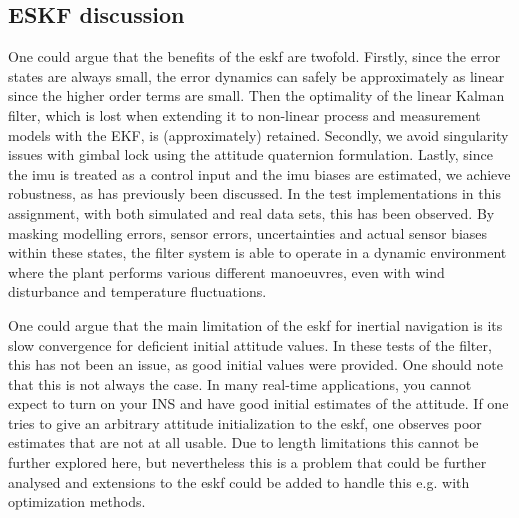 
\subsection{ESKF discussion}

One could argue that the benefits of the \acrshort{eskf} are twofold. Firstly, since the error states are always small, the error dynamics can safely be approximately as linear since the higher order terms are small. Then the optimality of the linear Kalman filter, which is lost when extending it to non-linear process and measurement models with the EKF, is (approximately) retained. Secondly, we avoid singularity issues with gimbal lock using the attitude quaternion formulation. Lastly, since the \acrshort{imu} is treated as a control input and the \acrshort{imu} biases are estimated, we achieve robustness, as has previously been discussed. In the test implementations in this assignment, with both simulated and real data sets, this has been observed. By masking modelling errors, sensor errors, uncertainties and actual sensor biases within these states, the filter system is able to operate in a dynamic environment where the plant performs various different manoeuvres, even with wind disturbance and temperature fluctuations.

One could argue that the main limitation of the \acrshort{eskf} for inertial navigation is its slow convergence for deficient initial attitude values. In these tests of the filter, this has not been an issue, as good initial values were provided. One should note that this is not always the case. In many real-time applications, you cannot expect to turn on your INS and have good initial estimates of the attitude. If one tries to give an arbitrary attitude initialization to the \acrshort{eskf}, one observes poor estimates that are not at all usable. Due to length limitations this cannot be further explored here, but nevertheless this is a problem that could be further analysed and extensions to the \acrshort{eskf} could be added to handle this e.g. with optimization methods.